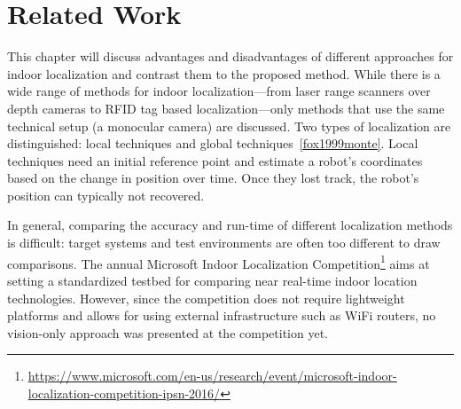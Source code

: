 \chapter{Related Work}
\label{chap:relatedwork}

This chapter will discuss advantages and disadvantages of different approaches for indoor localization and
contrast them to the proposed method. While there is a wide range of methods for indoor localization---from laser range scanners over depth cameras to RFID tag based localization---only methods that use the same technical setup (a monocular camera) are discussed. Two types of localization are distinguished: local techniques and global techniques~\ref{fox1999monte}. Local techniques need an initial reference point and estimate a robot's coordinates based on the change in position over time. Once they lost track, the robot's position can typically not recovered. 


In general, comparing the accuracy and run-time of different localization methods is difficult: target systems and test environments are often too different to draw comparisons. The annual Microsoft Indoor Localization Competition\footnote{\url{https://www.microsoft.com/en-us/research/event/microsoft-indoor-localization-competition-ipsn-2016/}} aims at setting a standardized testbed for comparing near real-time indoor location technologies. However, since the competition does not require lightweight platforms and allows for using external infrastructure such as WiFi routers, no vision-only approach was presented at the competition yet.